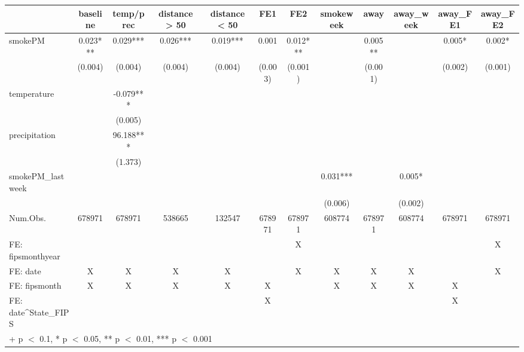 \begin{table}
\centering
\begin{tabular}[t]{lccccccccccc}
\toprule
  & baseline & temp/prec & distance > 50 & distance < 50 & FE1 & FE2 & smokeweek & away & away\_week & away\_FE1 & away\_FE2\\
\midrule
smokePM & 0.023*** & 0.029*** & 0.026*** & 0.019*** & 0.001 & 0.012*** &  & 0.005** &  & 0.005* & 0.002*\\
 & (0.004) & (0.004) & (0.004) & (0.004) & (0.003) & (0.001) &  & (0.001) &  & (0.002) & (0.001)\\
temperature &  & -0.079*** &  &  &  &  &  &  &  &  & \\
 &  & (0.005) &  &  &  &  &  &  &  &  & \\
precipitation &  & 96.188*** &  &  &  &  &  &  &  &  & \\
 &  & (1.373) &  &  &  &  &  &  &  &  & \\
smokePM\_lastweek &  &  &  &  &  &  & 0.031*** &  & 0.005* &  & \\
 &  &  &  &  &  &  & (0.006) &  & (0.002) &  & \\
\midrule
Num.Obs. & 678971 & 678971 & 538665 & 132547 & 678971 & 678971 & 608774 & 678971 & 608774 & 678971 & 678971\\
FE: fipsmonthyear &  &  &  &  &  & X &  &  &  &  & X\\
FE: date & X & X & X & X &  & X & X & X & X &  & X\\
FE: fipsmonth & X & X & X & X & X &  & X & X & X & X & \\
FE: date^State_FIPS &  &  &  &  & X &  &  &  &  & X & \\
\bottomrule
\multicolumn{12}{l}{\rule{0pt}{1em}+ p $<$ 0.1, * p $<$ 0.05, ** p $<$ 0.01, *** p $<$ 0.001}\\
\end{tabular}
\end{table}
